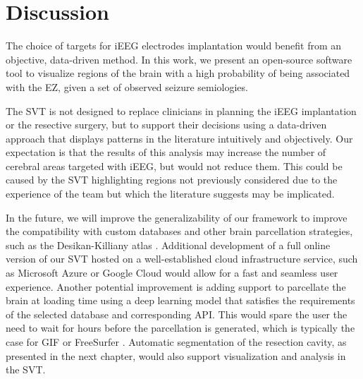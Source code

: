 \section{Discussion}
\label{sec:svt_discussion}

The choice of targets for \ac{iEEG} electrodes implantation would benefit from an objective, data-driven method.
In this work, we present an open-source software tool to visualize regions of the brain with a high probability of being associated with the \ac{EZ}, given a set of observed seizure semiologies.

The \ac{SVT} is not designed to replace clinicians in planning the \ac{iEEG} implantation or the resective surgery, but to support their decisions using a data-driven approach that displays patterns in the literature intuitively and objectively.
Our expectation is that the results of this analysis may increase the number of cerebral areas targeted with \ac{iEEG}, but would not reduce them.
This could be caused by the \ac{SVT} highlighting regions not previously considered due to the experience of the team but which the literature suggests may be implicated.  %

In the future, we will improve the generalizability of our framework to improve the compatibility with custom databases and other brain parcellation strategies, such as the Desikan-Killiany atlas \cite{desikan_automated_2006}.
Additional development of a full online version of our \ac{SVT} hosted on a well-established cloud infrastructure service, such as Microsoft Azure or Google Cloud would allow for a fast and seamless user experience.
Another potential improvement is adding support to parcellate the brain at loading time using a deep learning model \cite{li_compactness_2017,perez-garcia_fepegarhighresnet_2019} that satisfies the requirements of the selected database and corresponding \ac{API}.
This would spare the user the need to wait for hours before the parcellation is generated, which is typically the case for \ac{GIF} \cite{cardoso_geodesic_2015} or FreeSurfer%
.
Automatic segmentation of the resection cavity, as presented in the next chapter, would also support visualization and analysis in the \ac{SVT}.
